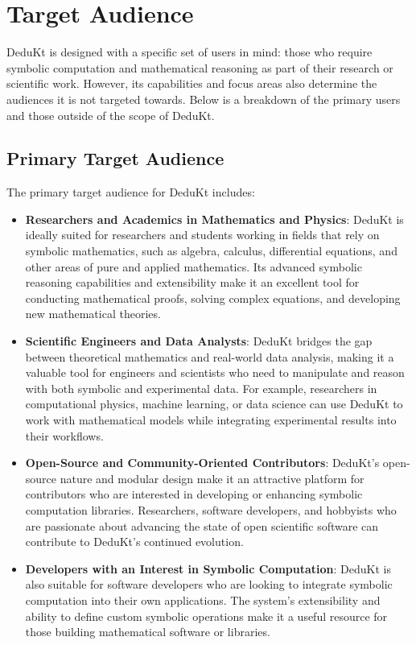 \section{Target Audience}\label{sec:target-audience}

DeduKt is designed with a specific set of users in mind: those who require symbolic computation and mathematical reasoning as part of their research or scientific work.
However, its capabilities and focus areas also determine the audiences it is not targeted towards.
Below is a breakdown of the primary users and those outside of the scope of DeduKt.

\subsection{Primary Target Audience}\label{subsec:primary-target-audience}

The primary target audience for DeduKt includes:

\begin{itemize}
    \item \textbf{Researchers and Academics in Mathematics and Physics}: DeduKt is ideally suited for researchers and students working in fields that rely on symbolic mathematics, such as algebra, calculus, differential equations, and other areas of pure and applied mathematics.
Its advanced symbolic reasoning capabilities and extensibility make it an excellent tool for conducting mathematical proofs, solving complex equations, and developing new mathematical theories.

    \item \textbf{Scientific Engineers and Data Analysts}: DeduKt bridges the gap between theoretical mathematics and real-world data analysis, making it a valuable tool for engineers and scientists who need to manipulate and reason with both symbolic and experimental data.
For example, researchers in computational physics, machine learning, or data science can use DeduKt to work with mathematical models while integrating experimental results into their workflows.

    \item \textbf{Open-Source and Community-Oriented Contributors}: DeduKt’s open-source nature and modular design make it an attractive platform for contributors who are interested in developing or enhancing symbolic computation libraries.
Researchers, software developers, and hobbyists who are passionate about advancing the state of open scientific software can contribute to DeduKt’s continued evolution.

    \item \textbf{Developers with an Interest in Symbolic Computation}: DeduKt is also suitable for software developers who are looking to integrate symbolic computation into their own applications.
The system’s extensibility and ability to define custom symbolic operations make it a useful resource for those building mathematical software or libraries.
\end{itemize}


